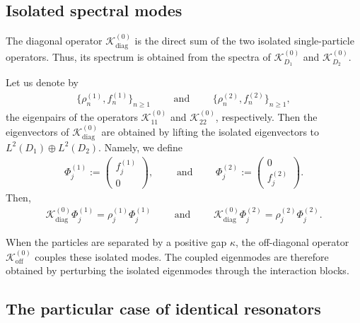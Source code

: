 \documentclass[10pt]{article}
\numberwithin{equation}{section}
\begin{document}
\subsection{Isolated spectral modes}


The diagonal operator $\mathcal K_{\mathrm{diag}}^{(0)}$ is the direct sum of the two isolated single-particle operators. Thus, its spectrum is obtained from the spectra of $\mathcal K_{D_1}^{(0)}$ and $\mathcal K_{D_2}^{(0)}$.

Let us denote by 
\begin{align}
    \{\rho_n^{(1)},f_n^{(1)}\}_{n\geq1}
    \qquad\text{ and }\qquad
    \{\rho_n^{(2)},f_n^{(2)}\}_{n\geq1},
\end{align}
the eigenpairs of the operators $\mathcal{K}^{(0)}_{11}$ and $\mathcal{K}^{(0)}_{22}$, respectively. Then the eigenvectors of $\mathcal{K}^{(0)}_{\mathrm{diag}}$ are obtained by lifting the isolated eigenvectors to $L^2(D_1) \oplus L^2(D_2)$. Namely, we define
\begin{align}
    \Phi_j^{(1)} :=
    \begin{pmatrix}
        f_j^{(1)}\\
        0
    \end{pmatrix},
    \qquad \text{ and } \qquad
    \Phi_j^{(2)} :=
    \begin{pmatrix}
        0\\
        f_j^{(2)}
    \end{pmatrix}.
\end{align}
Then,
\begin{align}
    \mathcal K_{\mathrm{diag}}^{(0)}\Phi_j^{(1)} = \rho_j^{(1)}\Phi_j^{(1)}
    \qquad \text{ and } \qquad
    \mathcal K_{\mathrm{diag}}^{(0)}\Phi_j^{(2)} = \rho_j^{(2)}\Phi_j^{(2)}.
\end{align}






When the particles are separated by a positive gap $\kappa$, the off-diagonal operator $\mathcal K_{\mathrm{off}}^{(0)}$ couples these isolated modes. The coupled eigenmodes are therefore obtained by perturbing the isolated eigenmodes through the interaction blocks.




\subsection{The particular case of identical resonators} \label{sec:identical_resonators}
\end{document}
